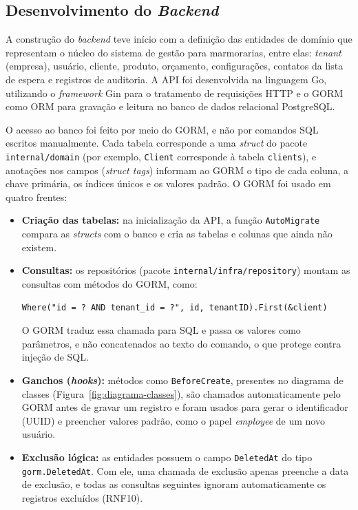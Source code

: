 \subsection{Desenvolvimento do \textit{Backend}}
\label{sec:desenvolvimento-backend}

A construção do \textit{backend} teve início com a definição das entidades de domínio que representam o núcleo do sistema de gestão para marmorarias, entre elas: \textit{tenant} (empresa), usuário, cliente, produto, orçamento, configurações, contatos da lista de espera e registros de auditoria. A API foi desenvolvida na linguagem Go, utilizando o \textit{framework} Gin para o tratamento de requisições HTTP e o GORM como ORM para gravação e leitura no banco de dados relacional PostgreSQL.

O acesso ao banco foi feito por meio do GORM, e não por comandos SQL escritos manualmente. Cada tabela corresponde a uma \textit{struct} do pacote \texttt{internal/\allowbreak{}domain} (por exemplo, \texttt{Client} corresponde à tabela \texttt{clients}), e anotações nos campos (\textit{struct tags}) informam ao GORM o tipo de cada coluna, a chave primária, os índices únicos e os valores padrão. O GORM foi usado em quatro frentes:

\begin{itemize}
\item \textbf{Criação das tabelas:} na inicialização da API, a função \texttt{AutoMigrate} compara as \textit{structs} com o banco e cria as tabelas e colunas que ainda não existem.
\item \textbf{Consultas:} os repositórios (pacote \texttt{internal/\allowbreak{}infra/\allowbreak{}repository}) montam as consultas com métodos do GORM, como:

\begin{center}
\small\texttt{Where("id = ? AND tenant\_id = ?", id, tenantID).First(\&client)}
\end{center}

O GORM traduz essa chamada para SQL e passa os valores como parâmetros, e não concatenados ao texto do comando, o que protege contra injeção de SQL.
\item \textbf{Ganchos (\textit{hooks}):} métodos como \texttt{BeforeCreate}, presentes no diagrama de classes (Figura~\ref{fig:diagrama-classes}), são chamados automaticamente pelo GORM antes de gravar um registro e foram usados para gerar o identificador (UUID) e preencher valores padrão, como o papel \textit{employee} de um novo usuário.
\item \textbf{Exclusão lógica:} as entidades possuem o campo \texttt{DeletedAt} do tipo \texttt{gorm.DeletedAt}. Com ele, uma chamada de exclusão apenas preenche a data de exclusão, e todas as consultas seguintes ignoram automaticamente os registros excluídos (RNF10).
\end{itemize}

